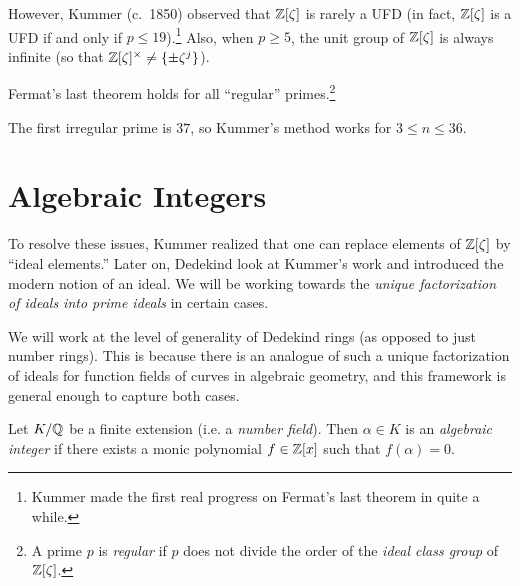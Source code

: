 \begin{remark}
  However, Kummer (c.~1850) observed that $\mathbb{Z}[\zeta]$ is
  rarely a UFD (in fact, $\mathbb{Z}[\zeta]$ is a UFD if and
  only if $p \le 19$).\footnote{Kummer made the first real progress on Fermat's last theorem in quite a while.} Also, when
  $p \ge 5$, the unit group of $\mathbb{Z}[\zeta]$ is
  always infinite (so that $\mathbb{Z}[\zeta]^\times \ne \{\pm \zeta^j\}$).
\end{remark}

\begin{theorem}[Kummer]
  Fermat's last theorem holds for all ``regular'' primes.\footnote{A prime $p$ is \emph{regular} if $p$ does not divide the order of the \emph{ideal class group} of $\mathbb{Z}[\zeta]$.}
\end{theorem}

\begin{remark}
  The first irregular prime is $37$, so Kummer's method
  works for $3 \le n \le 36$.
\end{remark}

\section{Algebraic Integers}

\begin{remark}
  To resolve these issues,
  Kummer realized that one can replace elements
  of $\mathbb{Z}[\zeta]$ by ``ideal elements.'' Later on,
  Dedekind look at Kummer's work and introduced
  the modern notion of an ideal. We will be working
  towards the \emph{unique factorization of ideals into
  prime ideals} in certain cases.
\end{remark}

\begin{remark}
  We will work at the level of generality of Dedekind
  rings (as opposed to just number rings). This is
  because there is an analogue of such a unique
  factorization of ideals
  for function fields of curves in algebraic geometry,
  and this framework is general enough to capture
  both cases.
\end{remark}

\begin{definition}
  Let $K / \mathbb{Q}$ be a finite extension (i.e. a \emph{number field}).
  Then $\alpha \in K$ is an \emph{algebraic integer}
  if there exists a monic polynomial $f \in \mathbb{Z}[x]$
  such that $f(\alpha) = 0$.
\end{definition}

